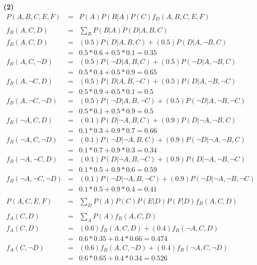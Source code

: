 \documentclass[11pt]{article}
\renewcommand{\part}[1] {\vspace{.10in} {\bf (#1)}}
\begin{document}
\part{2}
\begin{eqnarray*}
P(A, B, C, E, F) &=& P(A)P(B|A)P(C)f_D(A, B, C, E, F)\\
\\
f_B(A, C, D) &=& \sum_B P(B|A)P(D|A,B,C)\\
f_B(A, C, D) &=& (0.5)P(D|A,B,C) + (0.5)P(D|A,\neg B,C)\\
&=& 0.5*0.6 + 0.5*0.1 = 0.35\\
f_B(A, C, \neg D) &=& (0.5)P(\neg D|A,B,C) + (0.5)P(\neg D|A,\neg B,C)\\
&=& 0.5*0.4 + 0.5*0.9 = 0.65\\
f_B(A, \neg C, D) &=& (0.5)P(D|A,B,\neg C) + (0.5)P(D|A,\neg B,\neg C)\\
&=& 0.5*0.9 + 0.5*0.1 = 0.5\\
f_B(A, \neg C, \neg D) &=& (0.5)P(\neg D|A,B,\neg C) + (0.5)P(\neg D|A,\neg B,\neg C)\\
&=& 0.5*0.1 + 0.5*0.9 = 0.5\\
f_B(\neg A, C, D) &=& (0.1)P(D|\neg A,B,C) + (0.9)P(D|\neg A,\neg B,C)\\
&=& 0.1*0.3 + 0.9*0.7 = 0.66\\
f_B(\neg A, C, \neg D) &=& (0.1)P(\neg D|\neg A,B,C) + (0.9)P(\neg D|\neg A,\neg B,C)\\
&=& 0.1*0.7 + 0.9*0.3 = 0.34\\
f_B(\neg A, \neg C, D) &=& (0.1)P(D|\neg A,B,\neg C) + (0.9)P(D|\neg A,\neg B,\neg C)\\
&=& 0.1*0.5 + 0.9*0.6 = 0.59\\
f_B(\neg A, \neg C, \neg D) &=& (0.1)P(\neg D|\neg A,B,\neg C) + (0.9)P(\neg D|\neg A,\neg B,\neg C)\\
&=& 0.1*0.5 + 0.9*0.4 = 0.41\\
\\
P(A, C, E, F) &=& \sum_D P(A)P(C)P(E|D)P(F|D)f_B(A, C, D)\\
\\
f_A(C, D)  &=& \sum_A P(A)f_B(A, C, D)\\
f_A(C, D) &=& (0.6)f_B(A, C, D) + (0.4)f_B(\neg A, C, D)\\
&=& 0.6*0.35 + 0.4*0.66 = 0.474\\
f_A(C, \neg D) &=& (0.6)f_B(A, C, \neg D) + (0.4)f_B(\neg A, C, \neg D)\\
&=& 0.6*0.65 + 0.4*0.34 = 0.526\\

\end{eqnarray*}
\end{document}
